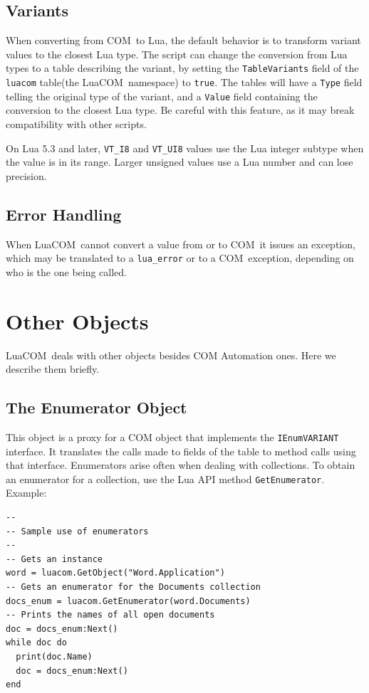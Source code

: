 \documentclass[11pt,a4paper,english]{report}
\newcommand{\ident}[1]{\mbox{\texttt{#1}}}
\newcommand{\techname}[1]{\mbox{#1}}
\newcommand{\lua}{\techname{Lua}}
\newcommand{\com}{\techname{COM}}
\newcommand{\luacom}{\techname{LuaCOM}}
\begin{document}
\subsection{Variants}

When converting from \com\ to \lua, the default behavior is to
transform variant values to the closest Lua type. The script can
change the conversion from Lua types to a table describing the
variant, by setting the \verb+TableVariants+ field of the
\verb+luacom+ table(the \luacom\ namespace) to \verb+true+. The
tables will have a \verb+Type+ field telling the original type of
the variant, and a \verb+Value+ field containing the conversion to
the closest Lua type. Be careful with this feature, as it may break
compatibility with other scripts.

On Lua 5.3 and later, \ident{VT_I8} and \ident{VT_UI8} values use the
Lua integer subtype when the value is in its range. Larger unsigned
values use a Lua number and can lose precision.

\subsection{Error Handling}
When \luacom\ cannot convert a value from or to \com\, it issues an
exception, which may be translated to a \verb+lua_error+ or to a \com\
exception, depending on who is the one being called.


\section{Other Objects}

\luacom\ deals with other objects besides COM Automation ones. Here we
describe them briefly.

\subsection{The Enumerator Object}
This object is a proxy for a COM object that implements the
\ident{IEnumVARIANT} interface. It translates the calls made to fields
of the table to method calls using that interface. Enumerators arise
often when dealing with collections. To obtain an enumerator for a
collection, use the Lua API method \ident{GetEnumerator}. Example:

\begin{verbatim}
--
-- Sample use of enumerators
--
-- Gets an instance
word = luacom.GetObject("Word.Application")
-- Gets an enumerator for the Documents collection
docs_enum = luacom.GetEnumerator(word.Documents)
-- Prints the names of all open documents
doc = docs_enum:Next()
while doc do
  print(doc.Name)
  doc = docs_enum:Next()
end
\end{verbatim}
\end{document}
